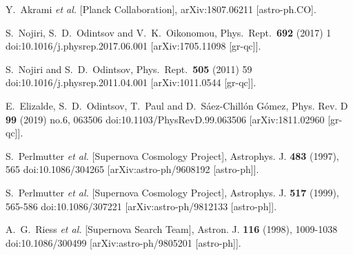 \documentclass{article}
\begin{document}
\begin{thebibliography}{99}
Y.~Akrami {\it et al.} [Planck Collaboration],
arXiv:1807.06211 [astro-ph.CO].


S.~Nojiri, S.~D.~Odintsov and V.~K.~Oikonomou,
Phys.\ Rept.\ {\bf 692} (2017) 1 doi:10.1016/j.physrep.2017.06.001
[arXiv:1705.11098 [gr-qc]].

S.~Nojiri and S.~D.~Odintsov,
Phys.\ Rept.\ {\bf 505} (2011) 59
doi:10.1016/j.physrep.2011.04.001 [arXiv:1011.0544 [gr-qc]].


E.~Elizalde, S.~D.~Odintsov, T.~Paul and D.~S\'aez-Chill\'on G\'omez,
Phys. Rev. D \textbf{99} (2019) no.6, 063506
doi:10.1103/PhysRevD.99.063506
[arXiv:1811.02960 [gr-qc]].




S.~Perlmutter \textit{et al.} [Supernova Cosmology Project],
Astrophys. J. \textbf{483} (1997), 565
doi:10.1086/304265
[arXiv:astro-ph/9608192 [astro-ph]].


S.~Perlmutter \textit{et al.} [Supernova Cosmology Project],
Astrophys. J. \textbf{517} (1999), 565-586
doi:10.1086/307221
[arXiv:astro-ph/9812133 [astro-ph]].


A.~G.~Riess \textit{et al.} [Supernova Search Team],
Astron. J. \textbf{116} (1998), 1009-1038
doi:10.1086/300499
[arXiv:astro-ph/9805201 [astro-ph]].





\end{thebibliography}
\end{document}
